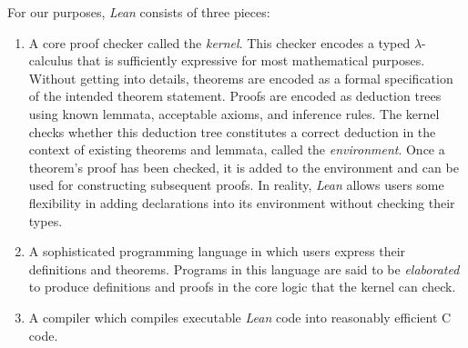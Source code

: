 \documentclass[12pt]{amsart}
\theoremstyle{definition}
\begin{document}
For our purposes, \emph{Lean} consists of three pieces:
\begin{enumerate}
    \item A core proof checker called the \emph{kernel}. This checker encodes a typed $\lambda$-calculus that is sufficiently expressive for most mathematical purposes. Without getting into details, theorems are encoded as a formal specification of the intended theorem statement. Proofs are encoded as deduction trees using known lemmata, acceptable axioms, and inference rules. The kernel checks whether this deduction tree constitutes a correct deduction in the context of existing theorems and lemmata, called the \emph{environment}. Once a theorem's proof has been checked, it is added to the environment and can be used for constructing subsequent proofs. In reality, \emph{Lean} allows users some flexibility in adding declarations into its environment without checking their types.
    \item A sophisticated programming language in which users express their definitions and theorems. Programs in this language are said to be \emph{elaborated} to produce definitions and proofs in the core logic that the kernel can check.
    \item A compiler which compiles executable \emph{Lean} code into reasonably efficient C code.
\end{enumerate}
\end{document}
